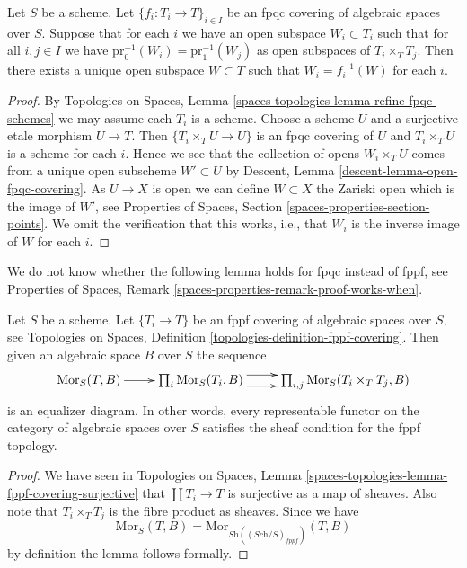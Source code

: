 \begin{lemma}
\label{lemma-open-fpqc-covering}
Let $S$ be a scheme.
Let $\{f_i : T_i \to T\}_{i \in I}$ be an fpqc covering
of algebraic spaces over $S$.
Suppose that for each $i$ we have an open subspace $W_i \subset T_i$
such that for all $i,j \in I$ we have
$\text{pr}_0^{-1}(W_i) = \text{pr}_1^{-1}(W_j)$ as open
subspaces of $T_i \times_T T_j$. Then there exists a unique open subspace
$W \subset T$ such that $W_i = f_i^{-1}(W)$ for each $i$.
\end{lemma}

\begin{proof}
By
Topologies on Spaces, Lemma \ref{spaces-topologies-lemma-refine-fpqc-schemes}
we may assume each $T_i$ is a scheme.
Choose a scheme $U$ and a surjective etale morphism $U \to T$.
Then $\{T_i \times_T U \to U\}$ is an fpqc covering of $U$
and $T_i \times_T U$ is a scheme for each $i$. Hence we
see that the collection of opens $W_i \times_T U$ comes from a unique
open subscheme $W' \subset U$ by
Descent, Lemma \ref{descent-lemma-open-fpqc-covering}.
As $U \to X$ is open we can define $W \subset X$ the Zariski
open which is the image of $W'$, see
Properties of Spaces, Section \ref{spaces-properties-section-points}.
We omit the verification that this works, i.e., that
$W_i$ is the inverse image of $W$ for each $i$.
\end{proof}

\noindent
We do not know whether the following lemma holds for fpqc instead of
fppf, see
Properties of Spaces, Remark \ref{spaces-properties-remark-proof-works-when}.

\begin{lemma}
\label{lemma-fppf-universal-effective-epimorphisms}
Let $S$ be a scheme.
Let $\{T_i \to T\}$ be an fppf covering of algebraic
spaces over $S$, see
Topologies on Spaces, Definition \ref{topologies-definition-fppf-covering}.
Then given an algebraic space $B$ over $S$ the sequence
$$
\xymatrix{
\text{Mor}_S(T, B) \ar[r] &
\prod\nolimits_i \text{Mor}_S(T_i, B) \ar@<1ex>[r] \ar@<-1ex>[r] &
\prod\nolimits_{i, j} \text{Mor}_S(T_i \times_T T_j, B)
}
$$
is an equalizer diagram.
In other words, every representable functor on the category of
algebraic spaces over $S$ satisfies the sheaf condition for the fppf topology.
\end{lemma}

\begin{proof}
We have seen in
Topologies on Spaces,
Lemma \ref{spaces-topologies-lemma-fppf-covering-surjective}
that $\coprod T_i \to T$ is surjective as a map of sheaves.
Also note that $T_i \times_T T_j$ is the fibre product as sheaves.
Since we have
$$
\text{Mor}_S(T, B) = \text{Mor}_{\textit{Sh}((\textit{Sch}/S)_{fppf})}(T, B)
$$
by definition the lemma follows formally.
\end{proof}







